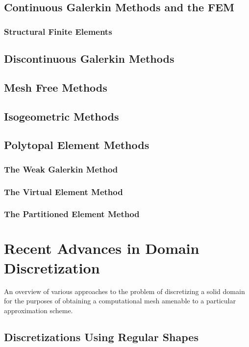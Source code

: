 \subsection{Continuous Galerkin Methods and the FEM}
\subsubsection{Structural Finite Elements}

\subsection{Discontinuous Galerkin Methods}

\subsection{Mesh Free Methods}

\subsection{Isogeometric Methods}

\subsection{Polytopal Element Methods}
\subsubsection{The Weak Galerkin Method}
\subsubsection{The Virtual Element Method}
\subsubsection{The Partitioned Element Method}

\section{Recent Advances in Domain Discretization}
%
An overview of various approaches to the problem of discretizing a solid domain for the purposes of obtaining a computational mesh amenable to a particular approximation scheme.
\subsection{Discretizations Using Regular Shapes}

